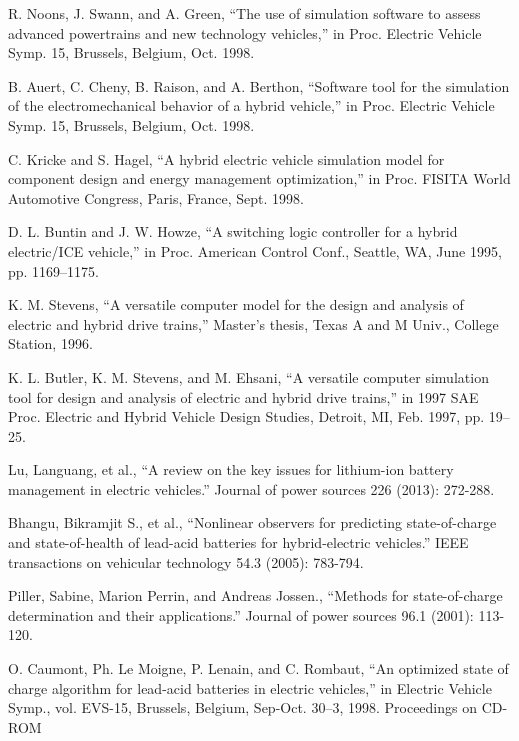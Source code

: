 R. Noons, J. Swann, and A. Green, ``The use of simulation software
to assess advanced powertrains and new technology vehicles,'' in Proc.
Electric Vehicle Symp. 15, Brussels, Belgium, Oct. 1998.

B. Auert, C. Cheny, B. Raison, and A. Berthon, ``Software tool for the
simulation of the electromechanical behavior of a hybrid vehicle,'' in
Proc. Electric Vehicle Symp. 15, Brussels, Belgium, Oct. 1998.

C. Kricke and S. Hagel, ``A hybrid electric vehicle simulation model
for component design and energy management optimization,'' in Proc.
FISITA World Automotive Congress, Paris, France, Sept. 1998.

D. L. Buntin and J. W. Howze, ``A switching logic controller for a
hybrid electric/ICE vehicle,'' in Proc. American Control Conf., Seattle,
WA, June 1995, pp. 1169–1175.

K. M. Stevens, ``A versatile computer model for the design and analysis
of electric and hybrid drive trains,'' Master’s thesis, Texas A and M Univ.,
College Station, 1996.

K. L. Butler, K. M. Stevens, and M. Ehsani, ``A versatile computer
simulation tool for design and analysis of electric and hybrid drive
trains,'' in 1997 SAE Proc. Electric and Hybrid Vehicle Design Studies,
Detroit, MI, Feb. 1997, pp. 19–25.


Lu, Languang, et al., ``A review on the key issues for lithium-ion battery management in electric vehicles.'' Journal of power sources 226 (2013): 272-288.

Bhangu, Bikramjit S., et al., ``Nonlinear observers for predicting state-of-charge and state-of-health of lead-acid batteries for hybrid-electric vehicles.'' IEEE transactions on vehicular technology 54.3 (2005): 783-794.

Piller, Sabine, Marion Perrin, and Andreas Jossen., ``Methods for state-of-charge determination and their applications.'' Journal of power sources 96.1 (2001): 113-120.

O. Caumont, Ph. Le Moigne, P. Lenain, and C. Rombaut, ``An optimized
state of charge algorithm for lead-acid batteries in electric vehicles,'' in
Electric Vehicle Symp., vol. EVS-15, Brussels, Belgium, Sep-Oct. 30–3,
1998. Proceedings on CD-ROM

